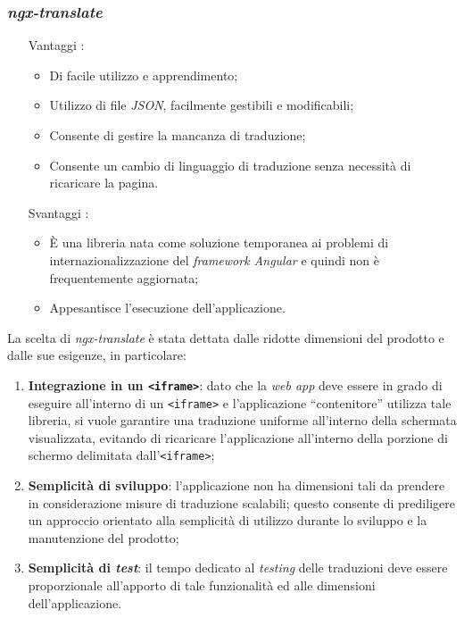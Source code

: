 \subsubsection*{\textit{ngx-translate}}
\begin{itemize}[align=left]
    \item [Vantaggi]:
        \begin{itemize}
            \item Di facile utilizzo e apprendimento;
            \item Utilizzo di file \textit{JSON}, facilmente gestibili e modificabili;
            \item Consente di gestire la mancanza di traduzione;
            \item Consente un cambio di linguaggio di traduzione senza necessità di ricaricare la pagina.
        \end{itemize}
    \item [Svantaggi]:
        \begin{itemize}
            \item È una libreria nata come soluzione temporanea ai problemi di internazionalizzazione del \textit{framework Angular} e quindi non è frequentemente aggiornata;
            \item Appesantisce l’esecuzione dell’applicazione.
        \end{itemize}
\end{itemize}

La scelta di \textit{ngx-translate} è stata dettata dalle ridotte dimensioni del prodotto e dalle sue esigenze, in particolare:
\begin{enumerate}
    \item \textbf{Integrazione in un \texttt{<iframe>}}: dato che la \textit{web app} deve essere in grado di eseguire all’interno di un \texttt{<iframe>} e l’applicazione “contenitore” utilizza tale libreria, si vuole garantire una traduzione
    uniforme all’interno della schermata visualizzata, evitando di ricaricare l’applicazione all’interno della porzione di schermo delimitata dall’\texttt{<iframe>};
    \item \textbf{Semplicità di sviluppo}: l’applicazione non ha dimensioni tali da prendere in considerazione misure di traduzione scalabili; questo consente di prediligere un approccio orientato alla semplicità di utilizzo durante lo sviluppo e la manutenzione del prodotto;
    \item \textbf{Semplicità di \textit{test}}: il tempo dedicato al \textit{testing} delle traduzioni deve essere proporzionale all’apporto di tale funzionalità ed alle dimensioni dell’applicazione.
\end{enumerate}

